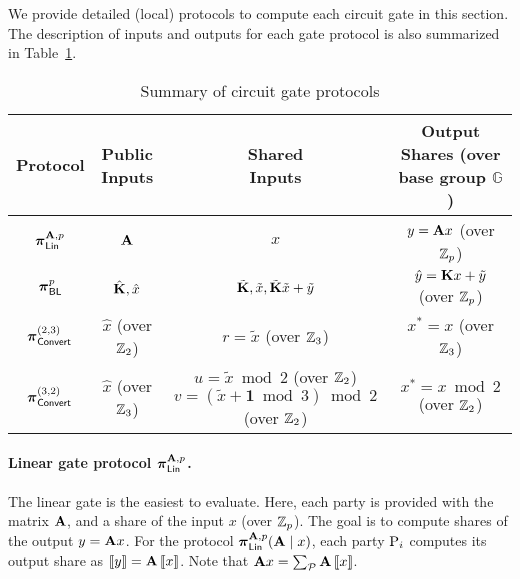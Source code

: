 We provide detailed (local) protocols to compute each circuit gate in this section. The description of inputs and outputs for each gate protocol is also summarized in Table~\ref{table:gate_protocol_summary}.


\begin{table}[h]
\centering
{
\renewcommand{\arraystretch}{1.5}
\begin{tabular}{|c|c|c|c|}

\hline
Protocol & \makecell{Public \\ Inputs} & \makecell{Shared \\ Inputs} & \makecell{Output Shares \\ (over base group $\mathbb{G}$)} \\
\hline
$\prot_{\LMap}^{\mat{A},p}$ & $\mat{A}$ & $x$ & $y = \mat{A}x$ (over $\mathbb{Z}_p$)\\
\hline
$\boldsymbol{\pi}_{\textsf{BL}}^p$ & $\hat{\mat{K}}, \hat{x}$ & $\tilde{\mat{K}},\tilde{x}, \tilde{\mat{K}}\tilde{x} + \tilde{y}$ & $\hat{y} = \mat{K}x + \tilde{y}$ (over $\mathbb{Z}_p$)\\
\hline
$\boldsymbol{\pi}_{\textsf{Convert}}^{(2,3)}$ & $\hat{x}$ (over $\mathbb{Z}_2$) & $r = \tilde{x}$ (over $\mathbb{Z}_3$) & $x^* = x$ (over $\mathbb{Z}_3$) \\
\hline
$\boldsymbol{\pi}_{\textsf{Convert}}^{(3,2)}$ & $\hat{x}$ (over $\mathbb{Z}_3$) & \makecell{$u = \tilde{x} \bmod 2$ (over $\mathbb{Z}_2$) \\ $v = (\tilde{x} + \textbf{1} \bmod 3) \bmod 2$ (over $\mathbb{Z}_2$)} & $x^* = x \bmod 2$ (over $\mathbb{Z}_2$) \\
\hline
\end{tabular}
}
\caption{Summary of circuit gate protocols}
\label{table:gate_protocol_summary}
\end{table}


\paragraph{Linear gate protocol $\prot_\LMap^{\mat{A}, p}$.}
The linear gate is the easiest to evaluate. Here, each party is provided with the matrix $\mat{A}$, and a share of the input $x$ (over $\mathbb{Z}_p$). The goal is to compute shares of the output $y = \mat{A}x$. For the protocol $\prot_\LMap^{\mat{A}, p}(\mat{A} \mid x)$, each party $\textnormal{P}_i$ computes its output share as $\share{y} = \mat{A}\share{x}$. Note that $\mat{A}x = \sum_{\parties}\mat{A}\share{x}$.



